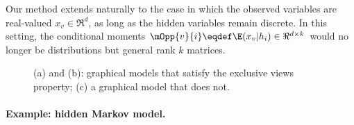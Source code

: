 Our method extends naturally to the case in which the observed variables
  are real-valued $x_v \in \Re^d$, as long as the hidden variables remain discrete. 
In this setting, the conditional moments
  $\mOpp{v}{i} \eqdef \E(x_v | h_i) \in \Re^{d \times k}$
  would no longer be distributions but general rank $k$ matrices.

\begin{figure}
  \centering
  \caption{(a) and (b): graphical models that satisfy the exclusive views property;
  (c) a graphical model that does not.}
  \label{fig:examples}
\end{figure}


\paragraph{Example: hidden Markov model.}

